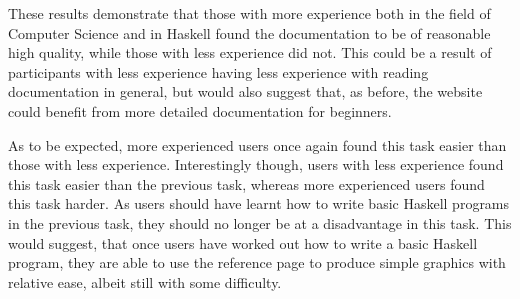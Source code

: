 \documentclass[../main.tex]{subfiles}
\begin{document}
                These results demonstrate that those with more experience both in the field of
                    Computer Science and in Haskell found the documentation to be of reasonable
                    high quality, while those with less experience did not.
                This could be a result of participants with less experience having less
                    experience with reading documentation in general, but would also suggest that,
                    as before, the website could benefit from more detailed documentation for
                    beginners.

                As to be expected, more experienced users once again found this task easier
                    than those with less experience.
                Interestingly though, users with less experience found this task easier than
                    the previous task, whereas more experienced users found this task harder.
                As users should have learnt how to write basic Haskell programs in the previous
                    task, they should no longer be at a disadvantage in this task.
                This would suggest, that once users have worked out how to write a basic
                    Haskell program, they are able to use the reference page to produce simple
                    graphics with relative ease, albeit still with some difficulty.
\end{document}
